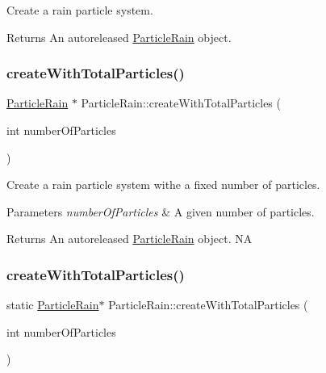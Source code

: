 Create a rain particle system.

\begin{DoxyReturn}{Returns}
An autoreleased \hyperlink{classParticleRain}{Particle\+Rain} object. 
\end{DoxyReturn}
\mbox{\label{classParticleRain_a514aadfca68cfc54cd534aa51ff6230d}} 
\subsubsection{\texorpdfstring{create\+With\+Total\+Particles()}{createWithTotalParticles()}\hspace{0.1cm}{\footnotesize\ttfamily [1/2]}}
{\footnotesize\ttfamily \hyperlink{classParticleRain}{Particle\+Rain} $\ast$ Particle\+Rain\+::create\+With\+Total\+Particles (\begin{DoxyParamCaption}\item[{int}]{number\+Of\+Particles }\end{DoxyParamCaption})\hspace{0.3cm}{\ttfamily [static]}}

Create a rain particle system withe a fixed number of particles.


\begin{DoxyParams}{Parameters}
{\em number\+Of\+Particles} & A given number of particles. \\
\hline
\end{DoxyParams}
\begin{DoxyReturn}{Returns}
An autoreleased \hyperlink{classParticleRain}{Particle\+Rain} object.  NA 
\end{DoxyReturn}
\mbox{\label{classParticleRain_a910fb8fe21820cffa5197b90925d0f29}} 
\subsubsection{\texorpdfstring{create\+With\+Total\+Particles()}{createWithTotalParticles()}\hspace{0.1cm}{\footnotesize\ttfamily [2/2]}}
{\footnotesize\ttfamily static \hyperlink{classParticleRain}{Particle\+Rain}$\ast$ Particle\+Rain\+::create\+With\+Total\+Particles (\begin{DoxyParamCaption}\item[{int}]{number\+Of\+Particles }\end{DoxyParamCaption})\hspace{0.3cm}{\ttfamily [static]}}

